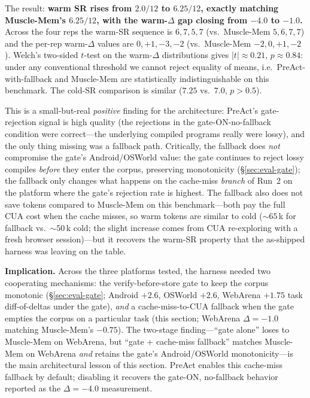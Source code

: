 \documentclass[11pt]{article}
\begin{document}
The result: \textbf{warm SR rises from $2.0/12$ to $6.25/12$, exactly matching Muscle-Mem's $6.25/12$, with the warm-$\Delta$ gap closing from $-4.0$ to $-1.0$.} Across the four reps the warm-SR sequence is $6, 7, 5, 7$ (vs.\ Muscle-Mem $5, 6, 7, 7$) and the per-rep warm-$\Delta$ values are $0, +1, -3, -2$ (vs.\ Muscle-Mem $-2, 0, +1, -2$). Welch's two-sided $t$-test on the warm-$\Delta$ distributions gives $|t| \approx 0.21$, $p \approx 0.84$: under any conventional threshold we cannot reject equality of means, i.e.\ PreAct-with-fallback and Muscle-Mem are statistically indistinguishable on this benchmark. The cold-SR comparison is similar ($7.25$ vs.\ $7.0$, $p > 0.5$).

This is a small-but-real \emph{positive} finding for the architecture: PreAct's gate-rejection signal is high quality (the rejections in the gate-ON-no-fallback condition were correct---the underlying compiled programs really were lossy), and the only thing missing was a fallback path. Critically, the fallback does \emph{not} compromise the gate's Android/OSWorld value: the gate continues to reject lossy compiles \emph{before} they enter the corpus, preserving monotonicity (\S\ref{sec:eval-gate}); the fallback only changes what happens on the cache-miss \emph{branch} of Run~2 on the platform where the gate's rejection rate is highest. The fallback also does not save tokens compared to Muscle-Mem on this benchmark---both pay the full CUA cost when the cache misses, so warm tokens are similar to cold ($\sim 65$\,k for fallback vs.\ $\sim 50$\,k cold; the slight increase comes from CUA re-exploring with a fresh browser session)---but it recovers the warm-SR property that the as-shipped harness was leaving on the table.

\textbf{Implication.} Across the three platforms tested, the harness needed two cooperating mechanisms: the verify-before-store gate to keep the corpus monotonic (\S\ref{sec:eval-gate}; Android $+2.6$, OSWorld $+2.6$, WebArena $+1.75$ task diff-of-deltas under the gate), \emph{and} a cache-miss-to-CUA fallback when the gate empties the corpus on a particular task (this section; WebArena $\Delta = -1.0$ matching Muscle-Mem's $-0.75$). The two-stage finding---``gate alone'' loses to Muscle-Mem on WebArena, but ``gate + cache-miss fallback'' matches Muscle-Mem on WebArena \emph{and} retains the gate's Android/OSWorld monotonicity---is the main architectural lesson of this section. PreAct enables this cache-miss fallback by default; disabling it recovers the gate-ON, no-fallback behavior reported as the $\Delta = -4.0$ measurement.
\end{document}
